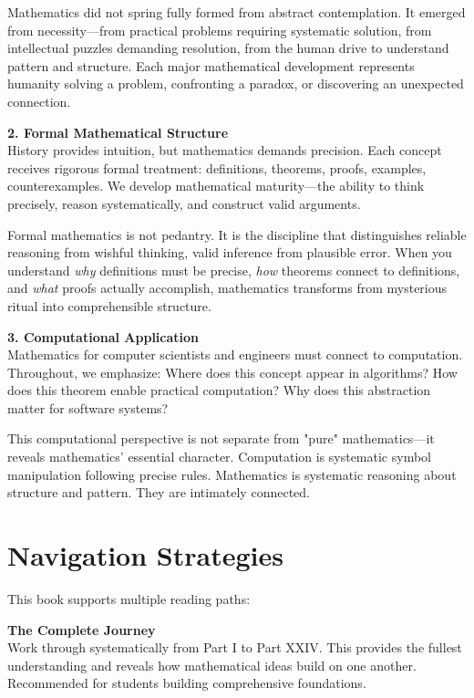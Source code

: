 Mathematics did not spring fully formed from abstract contemplation. It emerged from necessity—from practical problems requiring systematic solution, from intellectual puzzles demanding resolution, from the human drive to understand pattern and structure. Each major mathematical development represents humanity solving a problem, confronting a paradox, or discovering an unexpected connection.

\textbf{2. Formal Mathematical Structure}\\
History provides intuition, but mathematics demands precision. Each concept receives rigorous formal treatment: definitions, theorems, proofs, examples, counterexamples. We develop mathematical maturity—the ability to think precisely, reason systematically, and construct valid arguments.

Formal mathematics is not pedantry. It is the discipline that distinguishes reliable reasoning from wishful thinking, valid inference from plausible error. When you understand \textit{why} definitions must be precise, \textit{how} theorems connect to definitions, and \textit{what} proofs actually accomplish, mathematics transforms from mysterious ritual into comprehensible structure.

\textbf{3. Computational Application}\\
Mathematics for computer scientists and engineers must connect to computation. Throughout, we emphasize: Where does this concept appear in algorithms? How does this theorem enable practical computation? Why does this abstraction matter for software systems?

This computational perspective is not separate from "pure" mathematics—it reveals mathematics' essential character. Computation is systematic symbol manipulation following precise rules. Mathematics is systematic reasoning about structure and pattern. They are intimately connected.

\section*{Navigation Strategies}

This book supports multiple reading paths:

\textbf{The Complete Journey}\\
Work through systematically from Part I to Part XXIV. This provides the fullest understanding and reveals how mathematical ideas build on one another. Recommended for students building comprehensive foundations.

